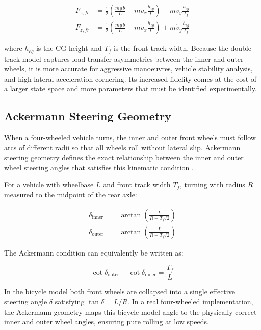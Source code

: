 \documentclass[a4paper,12pt]{report}
\begin{document}
\begin{align}
F_{z,fl} &= \frac{1}{2}\left(\frac{m g\, b}{L}
            - m\dot{v}_x\frac{h_{cg}}{L}\right)
            - m\dot{v}_y\frac{h_{cg}}{T_f} \\[4pt]
F_{z,fr} &= \frac{1}{2}\left(\frac{m g\, b}{L}
            - m\dot{v}_x\frac{h_{cg}}{L}\right)
            + m\dot{v}_y\frac{h_{cg}}{T_f}
\end{align}

where $h_{cg}$ is the CG height and $T_f$ is the front track width. Because the
double-track model captures load transfer asymmetries between the inner and
outer wheels, it is more accurate for aggressive manoeuvres, vehicle stability
analysis, and high-lateral-acceleration cornering. Its increased fidelity comes
at the cost of a larger state space and more parameters that must be identified
experimentally.

\subsection{Ackermann Steering Geometry}

When a four-wheeled vehicle turns, the inner and outer front wheels must follow
arcs of different radii so that all wheels roll without lateral slip. Ackermann
steering geometry defines the exact relationship between the inner and outer
wheel steering angles that satisfies this kinematic condition \cite{rajamani2012}.

For a vehicle with wheelbase $L$ and front track width $T_f$, turning with
radius $R$ measured to the midpoint of the rear axle:

\begin{align}
\delta_{\text{inner}} &= \arctan\!\left(\frac{L}{R - T_f/2}\right) \\[4pt]
\delta_{\text{outer}} &= \arctan\!\left(\frac{L}{R + T_f/2}\right)
\end{align}

The Ackermann condition can equivalently be written as:

\begin{equation}
\cot\delta_{\text{outer}} - \cot\delta_{\text{inner}} = \frac{T_f}{L}
\label{eq:ackermann}
\end{equation}

In the bicycle model both front wheels are collapsed into a single effective
steering angle $\delta$ satisfying $\tan\delta = L/R$. In a real four-wheeled
implementation, the Ackermann geometry maps this bicycle-model angle to the
physically correct inner and outer wheel angles, ensuring pure rolling at low
speeds.
\end{document}
